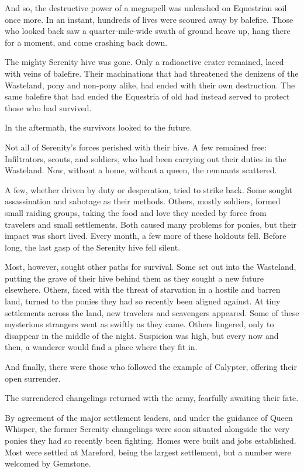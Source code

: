 And so, the destructive power of a megaspell was unleashed on Equestrian soil once more. In an instant, hundreds of lives were scoured away by balefire. Those who looked back saw a quarter-mile-wide swath of ground heave up, hang there for a moment, and come crashing back down.

The mighty Serenity hive was gone. Only a radioactive crater remained, laced with veins of balefire. Their machinations that had threatened the denizens of the Wasteland, pony and non-pony alike, had ended with their own destruction. The same balefire that had ended the Equestria of old had instead served to protect those who had survived.

In the aftermath, the survivors looked to the future.

{\br}%
Not all of Serenity’s forces perished with their hive. A few remained free: Infiltrators, scouts, and soldiers, who had been carrying out their duties in the Wasteland. Now, without a home, without a queen, the remnants scattered.

A few, whether driven by duty or desperation, tried to strike back. Some sought assassination and sabotage as their methods. Others, mostly soldiers, formed small raiding groups, taking the food and love they needed by force from travelers and small settlements. Both caused many problems for ponies, but their impact was short lived. Every month, a few more of these holdouts fell. Before long, the last gasp of the Serenity hive fell silent.

Most, however, sought other paths for survival. Some set out into the Wasteland, putting the grave of their hive behind them as they sought a new future elsewhere. Others, faced with the threat of starvation in a hostile and barren land, turned to the ponies they had so recently been aligned against. At tiny settlements across the land, new travelers and scavengers appeared. Some of these mysterious strangers went as swiftly as they came. Others lingered, only to disappear in the middle of the night. Suspicion was high, but every now and then, a wanderer would find a place where they fit in.

And finally, there were those who followed the example of Calypter, offering their open surrender.

{\br}%
The surrendered changelings returned with the army, fearfully awaiting their fate.

By agreement of the major settlement leaders, and under the guidance of Queen Whisper, the former Serenity changelings were soon situated alongside the very ponies they had so recently been fighting. Homes were built and jobs established. Most were settled at Mareford, being the largest settlement, but a number were welcomed by Gemstone.

